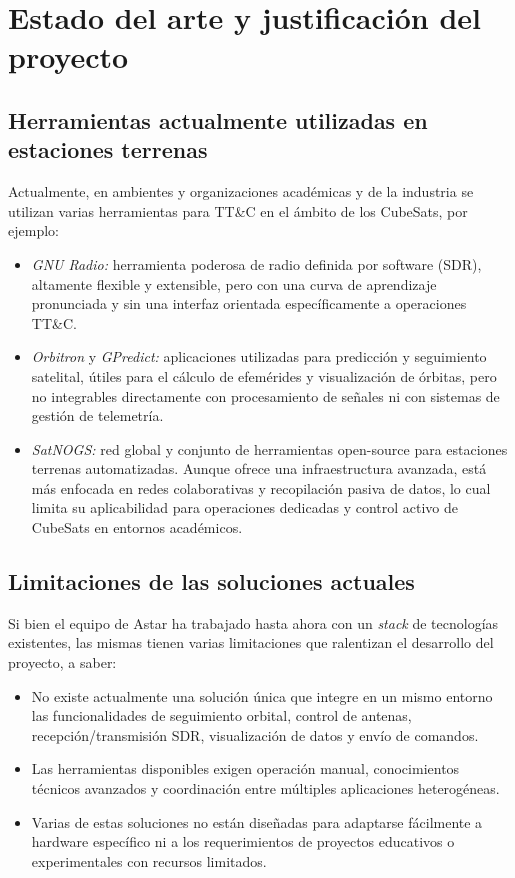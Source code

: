 \section*{Estado del arte y justificación del proyecto}

\subsection*{Herramientas actualmente utilizadas en estaciones terrenas}

Actualmente, en ambientes y organizaciones académicas y de la industria se utilizan varias herramientas para TT\&C en el ámbito de los CubeSats, por ejemplo:

\begin{itemize}
    \item \textit{GNU Radio:} herramienta poderosa de radio definida por software (SDR), altamente flexible y extensible, pero con una curva de aprendizaje pronunciada y sin una interfaz orientada específicamente a operaciones TT\&C.
    
    \item \textit{Orbitron} y \textit{GPredict:} aplicaciones utilizadas para predicción y seguimiento satelital, útiles para el cálculo de efemérides y visualización de órbitas, pero no integrables directamente con procesamiento de señales ni con sistemas de gestión de telemetría.
    
    \item \textit{SatNOGS:} red global y conjunto de herramientas open-source para estaciones terrenas automatizadas. Aunque ofrece una infraestructura avanzada, está más enfocada en redes colaborativas y recopilación pasiva de datos, lo cual limita su aplicabilidad para operaciones dedicadas y control activo de CubeSats en entornos académicos.
\end{itemize}

\subsection*{Limitaciones de las soluciones actuales}

Si bien el equipo de Astar ha trabajado hasta ahora con un \textit{stack} de tecnologías existentes, las mismas tienen varias limitaciones que ralentizan el desarrollo del proyecto, a saber:

\begin{itemize}
    \item No existe actualmente una solución única que integre en un mismo entorno las funcionalidades de seguimiento orbital, control de antenas, recepción/transmisión SDR, visualización de datos y envío de comandos.
    
    \item Las herramientas disponibles exigen operación manual, conocimientos técnicos avanzados y coordinación entre múltiples aplicaciones heterogéneas.
    
    \item Varias de estas soluciones no están diseñadas para adaptarse fácilmente a hardware específico ni a los requerimientos de proyectos educativos o experimentales con recursos limitados.
\end{itemize}

